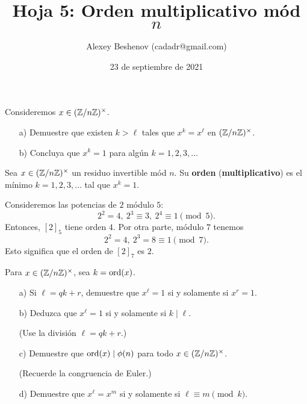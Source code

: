 \documentclass{article}
\title{Hoja 5: Orden multiplicativo mód $n$}
\author{Alexey Beshenov (cadadr@gmail.com)}
\date{23 de septiembre de 2021}
\begin{document}
\maketitle

\thispagestyle{empty}

\setcounter{section}{5}

\begin{problema}
  Consideremos $x \in (\mathbb{Z}/n\mathbb{Z})^\times$.

  \begin{enumerate}
  \item[a)] Demuestre que existen $k > \ell$ tales que $x^k = x^\ell$ en
    $(\mathbb{Z}/n\mathbb{Z})^\times$.

  \item[b)] Concluya que $x^k = 1$ para algún $k = 1,2,3,\ldots$
  \end{enumerate}
\end{problema}

\begin{definicion}
  Sea $x \in (\mathbb{Z}/n\mathbb{Z})^\times$ un residuo invertible mód $n$. Su \textbf{orden}
  (\textbf{multiplicativo}) es el mínimo $k = 1,2,3,\ldots$ tal que $x^k = 1$.
\end{definicion}

\begin{ejemplo}
  Consideremos las potencias de $2$ módulo $5$:
  \[
    2^2 = 4, ~
    2^3 \equiv 3, ~
    2^4 \equiv 1 \pmod{5}.
  \]
  Entonces, $[2]_5$ tiene orden $4$. Por otra parte, módulo $7$ tenemos
  \[
    2^2 = 4, ~
    2^3 = 8 \equiv 1 \pmod{7}.
  \]
  Esto significa que el orden de $[2]_7$ es $2$.
\end{ejemplo}

\begin{problema}
  Para $x \in (\mathbb{Z}/n\mathbb{Z})^\times$, sea $k = \operatorname{ord} (x)$.

  \begin{enumerate}
  \item[a)] Si $\ell = qk + r$, demuestre que $x^\ell = 1$ si y solamente si
    $x^r = 1$.

  \item[b)] Deduzca que $x^\ell = 1$ si y solamente si $k \mid \ell$.

    (Use la división $\ell = qk + r$.)

  \item[c)] Demuestre que $\operatorname{ord} (x) \mid \phi(n)$ para todo
    $x \in (\mathbb{Z}/n\mathbb{Z})^\times$.

    (Recuerde la congruencia de Euler.)

  \item[d)] Demuestre que $x^\ell = x^m$ si y solamente si
    $\ell \equiv m \pmod{k}$.
  \end{enumerate}
\end{problema}
\end{document}
